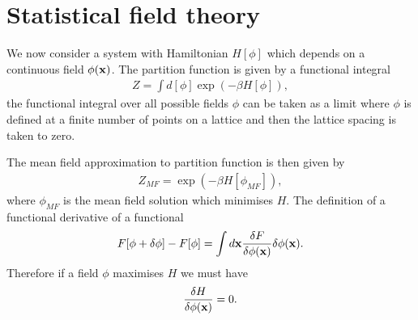 \section{Statistical field theory}
We now consider a system with Hamiltonian $H[\phi]$ which depends on a continuous field 
$\phi({\bf x})$. The partition function is given by a functional integral
\begin{align}
Z = \int d[\phi] \exp(-\beta H[\phi]),
\end{align}
the functional integral over all possible fields $\phi$ can be taken as a limit where $\phi$ is defined at a finite number of points on a lattice and then the lattice spacing is taken to zero. 

The mean field approximation to partition function is then given by
\begin{align}
Z _{MF}=  \exp(-\beta H[\phi_{MF}]),
\end{align} 
where $\phi_{MF}$ is the mean field solution which minimises $H$. The definition of a functional derivative of a functional 
\begin{align}
F[\phi+\delta\phi]-F[\phi]= \int d{\bf x} \frac{\delta F}{\delta\phi({\bf x})} \delta\phi({\bf x}).
\end{align}
Therefore if a field $\phi$ maximises $H$ we must have 
\begin{align}
\frac{\delta H}{\delta\phi({\bf x})}=0.
\end{align}

